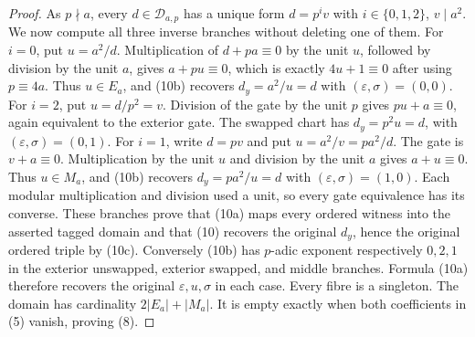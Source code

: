 \begin{theorem}
\begin{proof}
As \(p\nmid a\), every \(d\in\mathcal D_{a,p}\) has a unique form
\(d=p^i v\) with \(i\in\{0,1,2\}\), \(v\mid a^2\).
We now compute all three inverse branches without deleting one of them.
For \(i=0\), put \(u=a^2/d\). Multiplication of
\(d+pa\equiv0\) by the unit \(u\), followed by division by the
unit \(a\), gives \(a+pu\equiv0\), which is exactly
\(4u+1\equiv0\) after using \(p\equiv4a\).
Thus \(u\in E_a\), and (10b) recovers \(d_y=a^2/u=d\)
with \((\varepsilon,\sigma)=(0,0)\).
For \(i=2\), put \(u=d/p^2=v\). Division of the gate by the unit
\(p\) gives \(pu+a\equiv0\), again equivalent to the exterior
gate. The swapped chart has \(d_y=p^2u=d\), with
\((\varepsilon,\sigma)=(0,1)\).
For \(i=1\), write \(d=pv\) and put \(u=a^2/v=pa^2/d\).
The gate is \(v+a\equiv0\). Multiplication by the unit \(u\)
and division by the unit \(a\) gives \(a+u\equiv0\).
Thus \(u\in M_a\), and (10b) recovers \(d_y=pa^2/u=d\)
with \((\varepsilon,\sigma)=(1,0)\).
Each modular multiplication and division used a unit, so every
gate equivalence has its converse. These branches prove that
(10a) maps every ordered witness into the asserted tagged domain
and that (10) recovers the original \(d_y\), hence the original
ordered triple by (10c). Conversely (10b) has \(p\)-adic exponent
respectively \(0,2,1\) in the exterior unswapped, exterior swapped,
and middle branches. Formula (10a) therefore recovers the original
\(\varepsilon,u,\sigma\) in each case. Every fibre is a singleton.
The domain has cardinality \(2|E_a|+|M_a|\). It is empty exactly
when both coefficients in (5) vanish, proving (8).
\end{proof}
\end{theorem}

